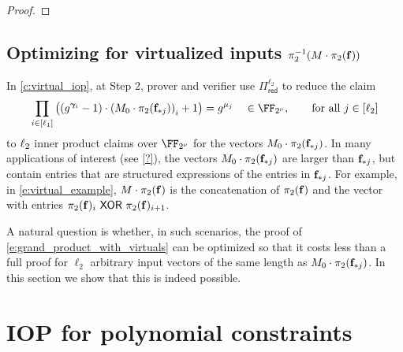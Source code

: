 \documentclass[11pt,letterpaper,usenames,dvipsnames]{article}
\begin{document}
\begin{theorem}\label{t:thm_virtual_IOPP}
\end{theorem}
\begin{proof}
\end{proof}

\subsection{Optimizing \ftwoz for virtualized inputs $\pi_2^{-1}(M\cdot \pi_2(\mathbf{f}))$}\label{s:opt_virtual}


In \cref{c:virtual_iop}, at Step 2, prover and verifier use $\Pi_{\mathsf{red}}^{\ell_2}$  to reduce the claim
%
\begin{equation}\label{e:grand_product_with_virtuals}
\prod_{i \in [\codedim_1]} \left(\left(g^{\bm{\gamma}_i}-1\right)\cdot \left(M_0\cdot \pi_2(\bff_{*j})\right)_i +1\right)= g^{\mu_j}  \quad  \in \comfield, \qquad \text{for all } j\in [\codedim_2]
\end{equation}
%
to $\ell_2$ inner product claims over $\comfield$ for the vectors $M_0\cdot \pi_2(\mathbf{f}_{*j})$. In many applications of interest (see \cref{?}), the vectors $M_0\cdot \pi_2(\mathbf{f}_{*j})$ are larger than $\mathbf{f}_{*j}$, but contain entries that are structured expressions of the entries in $\mathbf{f}_{*j}$. For example, in \cref{e:virtual_example}, $M\cdot \pi_2(\mathbf{f})$ is the concatenation of $\pi_2(\mathbf{f})$ and the vector with entries $\pi_2(\mathbf{f})_i \ \mathsf{XOR}\  \pi_2(\mathbf{f})_{i+1}$. 

A natural question is whether, in such scenarios, the proof of \eqref{e:grand_product_with_virtuals} can be optimized so that it costs less than a full proof for $\ell_2$ arbitrary input vectors of the same length as $M_0\cdot \pi_2(\mathbf{f}_{*j})$. In this section we show that this is indeed possible.




\section{\ftwoz IOP for polynomial constraints}






\end{document}

